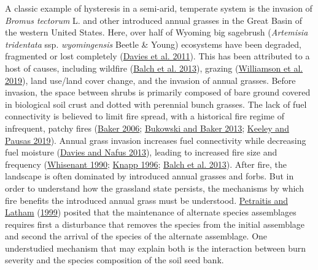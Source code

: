 \documentclass[
  12pt,
]{article}
\begin{document}
A classic example of hysteresis in a semi-arid, temperate system is the
invasion of \emph{Bromus tectorum} L. and other introduced annual
grasses in the Great Basin of the western United States. Here, over half
of Wyoming big sagebrush (\emph{Artemisia tridentata} ssp.
\emph{wyomingensis} Beetle \& Young) ecosystems have been degraded,
fragmented or lost completely (\protect\hyperlink{ref-Davies2011}{Davies
et al. 2011}). This has been attributed to a host of causes, including
wildfire (\protect\hyperlink{ref-Balch2013}{Balch et al. 2013}), grazing
(\protect\hyperlink{ref-Williamson2019}{Williamson et al. 2019}), land
use/land cover change, and the invasion of annual grasses. Before
invasion, the space between shrubs is primarily composed of bare ground
covered in biological soil crust and dotted with perennial bunch
grasses. The lack of fuel connectivity is believed to limit fire spread,
with a historical fire regime of infrequent, patchy fires
(\protect\hyperlink{ref-Baker2006}{Baker 2006};
\protect\hyperlink{ref-Bukowski2013}{Bukowski and Baker 2013};
\protect\hyperlink{ref-Keeley2019}{Keeley and Pausas 2019}). Annual
grass invasion increases fuel connectivity while decreasing fuel
moisture (\protect\hyperlink{ref-Davies2013}{Davies and Nafus 2013}),
leading to increased fire size and frequency
(\protect\hyperlink{ref-Whisenant1990}{Whisenant 1990};
\protect\hyperlink{ref-Knapp1996}{Knapp 1996};
\protect\hyperlink{ref-Balch2013}{Balch et al. 2013}). After fire, the
landscape is often dominated by introduced annual grasses and forbs. But
in order to understand how the grassland state persists, the mechanisms
by which fire benefits the introduced annual grass must be understood.
\protect\hyperlink{ref-Petraitis1999}{Petraitis and Latham}
(\protect\hyperlink{ref-Petraitis1999}{1999}) posited that the
maintenance of alternate species assemblages requires first a
disturbance that removes the species from the initial assemblage and
second the arrival of the species of the alternate assemblage. One
understudied mechanism that may explain both is the interaction between
burn severity and the species composition of the soil seed bank.
\end{document}
